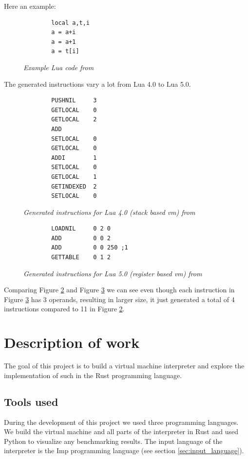 \documentclass{article}
\begin{document}
Here an example:

\begin{figure}[ht]
    \begin{verbatim}
        local a,t,i
        a = a+i
        a = a+1
        a = t[i]
    \end{verbatim}
    \caption{\textit{Example Lua code from ~\cite{lua_implementation}}}
    \label{fig:lua_code}
\end{figure}

The generated instructions vary a lot from Lua 4.0 to Lua 5.0.

\begin{figure}[ht]
    \begin{verbatim}
        PUSHNIL     3
        GETLOCAL    0
        GETLOCAL    2
        ADD
        SETLOCAL    0
        GETLOCAL    0
        ADDI        1
        SETLOCAL    0
        GETLOCAL    1
        GETINDEXED  2
        SETLOCAL    0
    \end{verbatim}
    \caption{\textit{Generated instructions for Lua 4.0 (stack based vm) from ~\cite{lua_implementation}}}
    \label{fig:lua_generated4}
\end{figure}


\begin{figure}[ht]
    \begin{verbatim}
        LOADNIL     0 2 0
        ADD         0 0 2
        ADD         0 0 250 ;1
        GETTABLE    0 1 2
    \end{verbatim}
    \caption{\textit{Generated instructions for Lua 5.0 (register based vm) from ~\cite{lua_implementation}}}
    \label{fig:lua_generated5}
\end{figure}

Comparing Figure \ref{fig:lua_generated4} and Figure \ref{fig:lua_generated5}
we can see even though each instruction in Figure \ref{fig:lua_generated5} has 3 operands,
resulting in larger size, it just generated a total of 4 instructions compared
to 11 in Figure \ref{fig:lua_generated4}.

\section{Description of work}
The goal of this project is to build a virtual machine interpreter and 
explore the implementation of such in the Rust programming language.

\subsection{Tools used}
During the development of this project we used three programming languages. We
build the virtual machine and all parts of the interpreter in Rust and used
Python to visualize any benchmarking results. The input language of the
interpreter is the Imp programming language (see section
\ref{sec:input_language}). ~\cite{Pierce:SF1}
\end{document}
